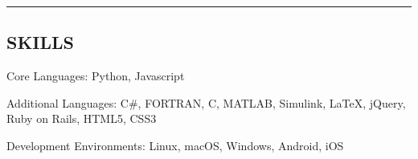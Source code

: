 \documentclass[letterpaper,MMMyyyy,nonstop]{simpleresumecv}
\newenvironment{indentsection}[1]%
{\begin{list}{}%
    {\setlength{\leftmargin}{#1}}%
    \item[]%
}
{\end{list}}
\newcommand{\CPP}
{C\nolinebreak[4]\hspace{-.05em}\raisebox{.22ex}{\footnotesize\bf ++}}
\begin{document}


\hrule
\vspace{-0.4em}
\subsection*{SKILLS}

\begin{indentsection}{\parindent}
    \begin{description*}
        \item[Core Languages:]
        Python, Javascript
        \item[Additional Languages:]
        C\#, FORTRAN, \CPP, MATLAB, Simulink, \LaTeX, jQuery, Ruby on Rails, HTML5, CSS3
        \item[Development Environments:]
        Linux, macOS, Windows, Android, iOS
    \end{description*}
\end{indentsection}










\end{document}
